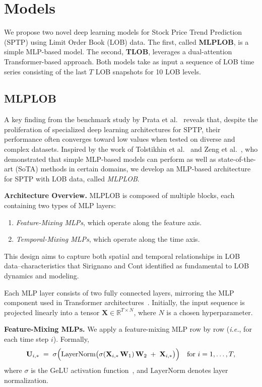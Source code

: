 \section{Models}
\label{sec:models}
We propose two novel deep learning models for Stock Price Trend Prediction (SPTP) using Limit Order Book (LOB) data. The first, called \textbf{MLPLOB}, is a simple MLP-based model. The second, \textbf{TLOB}, leverages a dual-attention Transformer-based approach. Both models take as input a sequence of LOB time series consisting of the last $T$ LOB snapshots for 10 LOB levels.

\subsection{MLPLOB}
A key finding from the benchmark study by Prata et al.~\cite{prata2024lob} reveals that, despite the proliferation of specialized deep learning architectures for SPTP, their performance often converges toward low values when tested on diverse and complex datasets. Inspired by the work of Tolstikhin et al.~\cite{tolstikhin2021mlp} and Zeng et al.~\cite{zeng2023transformers}, who demonstrated that simple MLP-based models can perform as well as state-of-the-art (SoTA) methods in certain domains, we develop an MLP-based architecture for SPTP with LOB data, called \emph{MLPLOB}.

\textbf{Architecture Overview.}
MLPLOB is composed of multiple blocks, each containing two types of MLP layers:
\begin{enumerate}
    \item \emph{Feature-Mixing MLPs}, which operate along the feature axis.
    \item \emph{Temporal-Mixing MLPs}, which operate along the time axis.
\end{enumerate}
This design aims to capture both spatial and temporal relationships in LOB data--characteristics that Sirignano and Cont \cite{sirignano2019deep, sirignano2021universal} identified as fundamental to LOB dynamics and modeling.

Each MLP layer consists of two fully connected layers, mirroring the MLP component used in Transformer architectures~\cite{vaswani2017attention}. Initially, the input sequence is projected linearly into a tensor $\mathbf{X}\in \mathbb{R}^{T \times N}$, where $N$ is a chosen hyperparameter.

\textbf{Feature-Mixing MLPs.}
We apply a feature-mixing MLP row by row (\emph{i.e.}, for each time step $i$). Formally,
\begin{equation}
    \mathbf{U}_{i,*} \;=\; 
    \sigma\Bigl(
      \text{LayerNorm}\bigl(
          \sigma(\mathbf{X}_{i,*}\,\mathbf{W}_1)\,\mathbf{W}_2 
          \;+\; \mathbf{X}_{i,*}
      \bigr)
    \Bigr)
    \quad\text{for } i=1,\dots,T,
\end{equation}
where $\sigma$ is the GeLU activation function~\cite{hendrycks2016gaussian}, and \(\text{LayerNorm}\) denotes layer normalization.

